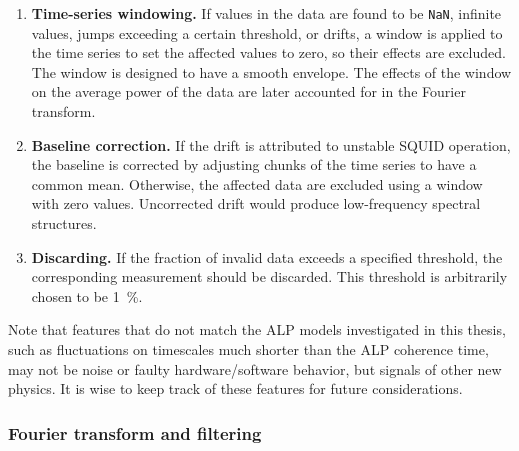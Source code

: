 \begin{enumerate}
    \item \textbf{Time-series windowing.} If values in the data are found to be \texttt{NaN}, infinite values, jumps exceeding a certain threshold, or drifts, a window is applied to the time series to set the affected values to zero, so their effects are excluded.
    The window is designed to have a smooth envelope.
    The effects of the window on the average power of the data are later accounted for in the Fourier transform.
    \item \textbf{Baseline correction.} If the drift is attributed to unstable SQUID operation, the baseline is corrected by adjusting chunks of the time series to have a common mean. Otherwise, the affected data are excluded using a window with zero values. Uncorrected drift would produce low-frequency spectral structures.
    \item \textbf{Discarding.} If the fraction of invalid data exceeds a specified threshold, the corresponding measurement should be discarded. This threshold is arbitrarily chosen to be \SI{1}{\percent}.
\end{enumerate}

Note that features that do not match the ALP models investigated in this thesis, such as fluctuations on timescales much shorter than the ALP coherence time, may not be noise or faulty hardware/software behavior, but signals of other new physics.
It is wise to keep track of these features for future considerations.



\subsubsection{Fourier transform and filtering}

